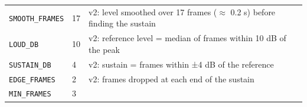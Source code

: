 \documentclass[
  10pt,
]{article}
\begin{document}
\begin{longtable}[]{@{}lll@{}}
\begin{minipage}[t]{0.30\columnwidth}\raggedright
\texttt{SMOOTH\_FRAMES}\strut
\end{minipage} &
\begin{minipage}[t]{0.30\columnwidth}\raggedright
17\strut
\end{minipage} &
\begin{minipage}[t]{0.30\columnwidth}\raggedright
v2: level smoothed over 17 frames ($\approx$ 0.2 s) before finding
the sustain\strut
\end{minipage}\tabularnewline
\begin{minipage}[t]{0.30\columnwidth}\raggedright
\texttt{LOUD\_DB}\strut
\end{minipage} &
\begin{minipage}[t]{0.30\columnwidth}\raggedright
10\strut
\end{minipage} &
\begin{minipage}[t]{0.30\columnwidth}\raggedright
v2: reference level = median of frames within 10 dB of the
peak\strut
\end{minipage}\tabularnewline
\begin{minipage}[t]{0.30\columnwidth}\raggedright
\texttt{SUSTAIN\_DB}\strut
\end{minipage} &
\begin{minipage}[t]{0.30\columnwidth}\raggedright
4\strut
\end{minipage} &
\begin{minipage}[t]{0.30\columnwidth}\raggedright
v2: sustain = frames within ±4 dB of the reference\strut
\end{minipage}\tabularnewline
\begin{minipage}[t]{0.30\columnwidth}\raggedright
\texttt{EDGE\_FRAMES}\strut
\end{minipage} &
\begin{minipage}[t]{0.30\columnwidth}\raggedright
2\strut
\end{minipage} &
\begin{minipage}[t]{0.30\columnwidth}\raggedright
v2: frames dropped at each end of the sustain\strut
\end{minipage}\tabularnewline
\begin{minipage}[t]{0.30\columnwidth}\raggedright
\texttt{MIN\_FRAMES}\strut
\end{minipage} &
\begin{minipage}[t]{0.30\columnwidth}\raggedright
3\strut
\end{minipage} &
\begin{minipage}[t]{0.30\columnwidth}\raggedright

\end{minipage}
\end{longtable}
\end{document}
